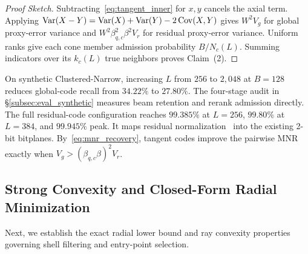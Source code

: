 \begin{proof}[Proof Sketch]
Subtracting~\eqref{eq:tangent_inner} for $x,y$ cancels the axial term. Applying $\operatorname{Var}(X-Y)=\operatorname{Var}(X)+\operatorname{Var}(Y)-2\operatorname{Cov}(X,Y)$ gives $W^2V_g$ for global proxy-error variance and $W^2\beta_{q,c}^2\beta^2V_r$ for residual proxy-error variance. Uniform ranks give each cone member admission probability $B/N_c(L)$. Summing indicators over its $k_c(L)$ true neighbors proves Claim~(2).
\end{proof}

On synthetic {Clustered-Narrow}, increasing $L$ from $256$ to $2{,}048$ at $B=128$ reduces global-code recall from $34.22\%$ to $27.80\%$. The four-stage audit in \S\ref{subsec:eval_synthetic} measures beam retention and rerank admission directly. The full residual-code configuration reaches $99.385\%$ at $L=256$, $99.80\%$ at $L=384$, and $99.945\%$ peak. It maps residual normalization~\cite{jegou2011pq} into the existing 2-bit bitplanes. By~\eqref{eq:mnr_recovery}, tangent codes improve the pairwise MNR exactly when $V_g>(\beta_{q,c}\beta)^2V_r$.

\subsection{Strong Convexity and Closed-Form Radial Minimization}
\label{subsec:geodesic_apex}

Next, we establish the exact radial lower bound and ray convexity properties governing shell filtering and entry-point selection.


